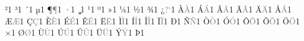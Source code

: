\documentclass{article}
\begin{document}
{        {^^b2}{{\textcolor{gray}{\texttwosuperior}}}1  %
        {^^b3}{{\textcolor{gray}{\textthreesuperior}}}1  %
        {^^b4}{{\textcolor{gray}{\textasciiacute}}}1  %
        {^^b5}{{\textcolor{gray}{\textmu}}}1  %
        {^^b6}{{\textcolor{gray}{\P}}}1  %
        {^^b7}{{\textcolor{gray}{\textperiodcentered}}}1  %
        {^^b8}{{\textcolor{gray}{\c{}}}}1  %
        {^^b9}{{\textcolor{gray}{\textonesuperior}}}1  %
        {^^ba}{{\textcolor{gray}{\textordmasculine}}}1  %
        {^^bb}{{\textcolor{gray}{\guillemotright}}}1  %
        {^^bc}{{\textcolor{gray}{\textonequarter}}}1  %
        {^^bd}{{\textcolor{gray}{\textonehalf}}}1  %
        {^^be}{{\textcolor{gray}{\textthreequarters}}}1  %
        {^^bf}{{\textcolor{gray}{?`}}}1  %
        {^^c0}{{\textcolor{gray}{\`{A}}}}1  %
        {^^c1}{{\textcolor{gray}{\'{A}}}}1  %
        {^^c2}{{\textcolor{gray}{\^{A}}}}1  %
        {^^c3}{{\textcolor{gray}{\~{A}}}}1  %
        {^^c4}{{\textcolor{gray}{\"{A}}}}1  %
        {^^c5}{{\textcolor{gray}{\AA}}}1  %
        {^^c6}{{\textcolor{gray}{\AE}}}1  %
        {^^c7}{{\textcolor{gray}{\c{C}}}}1  %
        {^^c8}{{\textcolor{gray}{\`{E}}}}1  %
        {^^c9}{{\textcolor{gray}{\'{E}}}}1  %
        {^^ca}{{\textcolor{gray}{\^{E}}}}1  %
        {^^cb}{{\textcolor{gray}{\"{E}}}}1  %
        {^^cc}{{\textcolor{gray}{\`{I}}}}1  %
        {^^cd}{{\textcolor{gray}{\'{I}}}}1  %
        {^^ce}{{\textcolor{gray}{\^{I}}}}1  %
        {^^cf}{{\textcolor{gray}{\"{I}}}}1  %
        {^^d0}{{\textcolor{gray}{\DH}}}1  %
        {^^d1}{{\textcolor{gray}{\~{N}}}}1  %
        {^^d2}{{\textcolor{gray}{\`{O}}}}1  %
        {^^d3}{{\textcolor{gray}{\'{O}}}}1  %
        {^^d4}{{\textcolor{gray}{\^{O}}}}1  %
        {^^d5}{{\textcolor{gray}{\~{O}}}}1  %
        {^^d6}{{\textcolor{gray}{\"{O}}}}1  %
        {^^d7}{{\textcolor{gray}{\texttimes}}}1  %
        {^^d8}{{\textcolor{gray}{\O}}}1  %
        {^^d9}{{\textcolor{gray}{\`{U}}}}1  %
        {^^da}{{\textcolor{gray}{\'{U}}}}1  %
        {^^db}{{\textcolor{gray}{\^{U}}}}1  %
        {^^dc}{{\textcolor{gray}{\"{U}}}}1  %
        {^^dd}{{\textcolor{gray}{\'{Y}}}}1  %
        {^^de}{{\textcolor{gray}{\TH}}}1  %
}
\end{document}
